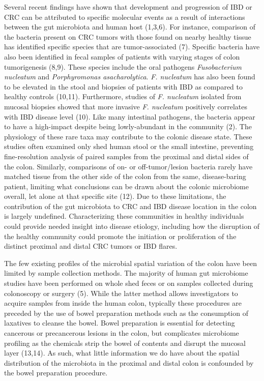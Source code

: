 \documentclass[12pt,]{article}
\begin{document}
Several recent findings have shown that development and progression of
IBD or CRC can be attributed to specific molecular events as a result of
interactions between the gut microbiota and human host (1,3,6). For
instance, comparison of the bacteria present on CRC tumors with those
found on nearby healthy tissue has identified specific species that are
tumor-associated (7). Specific bacteria have also been identified in
fecal samples of patients with varying stages of colon tumorigenesis
(8,9). These species include the oral pathogens \emph{Fusobacterium
nucleatum} and \emph{Porphyromonas asacharolytica}. \emph{F. nucleatum}
has also been found to be elevated in the stool and biopsies of patients
with IBD as compared to healthy controls (10,11). Furthermore, studies
of \emph{F. nucleatum} isolated from mucosal biopsies showed that more
invasive \emph{F. nucleatum} positively correlates with IBD disease
level (10). Like many intestinal pathogens, the bacteria appear to have
a high-impact despite being lowly-abundant in the community (2). The
physiology of these rare taxa may contribute to the colonic disease
state. These studies often examined only shed human stool or the small
intestine, preventing fine-resolution analysis of paired samples from
the proximal and distal sides of the colon. Similarly, comparisons of
on- or off-tumor/lesion bacteria rarely have matched tissue from the
other side of the colon from the same, disease-baring patient, limiting
what conclusions can be drawn about the colonic microbiome overall, let
alone at that specific site (12). Due to these limitations, the
contribution of the gut microbiota to CRC and IBD disease location in
the colon is largely undefined. Characterizing these communities in
healthy individuals could provide needed insight into disease etiology,
including how the disruption of the healthy community could promote the
initiation or proliferation of the distinct proximal and distal CRC
tumors or IBD flares.

The few existing profiles of the microbial spatial variation of the
colon have been limited by sample collection methods. The majority of
human gut microbiome studies have been performed on whole shed feces or
on samples collected during colonoscopy or surgery (5). While the latter
method allows investigators to acquire samples from inside the human
colon, typically these procedures are preceded by the use of bowel
preparation methods such as the consumption of laxatives to cleanse the
bowel. Bowel preparation is essential for detecting cancerous or
precancerous lesions in the colon, but complicates microbiome profiling
as the chemicals strip the bowel of contents and disrupt the mucosal
layer (13,14). As such, what little information we do have about the
spatial distribution of the microbiota in the proximal and distal colon
is confounded by the bowel preparation procedure.
\end{document}
